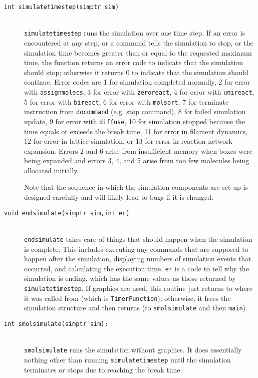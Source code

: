 \documentclass {book}
\begin{document}
\begin{description}
\item[\texttt{int simulatetimestep(simptr sim)}]
\hfill \\
\texttt{simulatetimestep} runs the simulation over one time step. If an error is encountered at any step, or a command tells the simulation to stop, or the simulation time becomes greater than or equal to the requested maximum time, the function returns an error code to indicate that the simulation should stop; otherwise it returns 0 to indicate that the simulation should continue. Error codes are 1 for simulation completed normally, 2 for error with \texttt{assignmolecs}, 3 for error with \texttt{zeroreact}, 4 for error with \texttt{unireact}, 5 for error with \texttt{bireact}, 6 for error with \texttt{molsort}, 7 for terminate instruction from \texttt{docommand} (e.g. stop command), 8 for failed simulation update, 9 for error with \texttt{diffuse}, 10 for simulation stopped because the time equals or exceeds the break time, 11 for error in filament dynamics, 12 for error in lattice simulation, or 13 for error in reaction network expansion. Errors 2 and 6 arise from insufficient memory when boxes were being expanded and errors 3, 4, and 5 arise from too few molecules being allocated initially.

Note that the sequence in which the simulation components are set up is designed carefully and will likely lead to bugs if it is changed.

\item[\texttt{void endsimulate(simptr sim,int er)}]
\hfill \\
\texttt{endsimulate} takes care of things that should happen when the simulation is complete. This includes executing any commands that are supposed to happen after the simulation, displaying numbers of simulation events that occurred, and calculating the execution time. \texttt{er} is a code to tell why the simulation is ending, which has the same values as those returned by \texttt{simulatetimestep}. If graphics are used, this routine just returns to where it was called from (which is \texttt{TimerFunction}); otherwise, it frees the simulation structure and then returns (to \texttt{smolsimulate} and then \texttt{main}).

\item[\texttt{int smolsimulate(simptr sim);}]
\hfill \\
\texttt{smolsimulate} runs the simulation without graphics. It does essentially nothing other than running \texttt{simulatetimestep} until the simulation terminates or stops due to reaching the break time.

\end{description}
\end{document}
